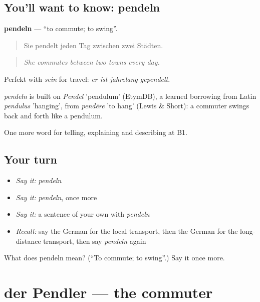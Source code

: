 \subsection*{You'll want to know: pendeln}
\textbf{pendeln} — \textquotedblleft{}to commute; to swing\textquotedblright{}.

\begin{quote}
Sie pendelt jeden Tag zwischen zwei Städten.
\end{quote}

\begin{quote}
\emph{She commutes between two towns every day.}
\end{quote}

Perfekt with \emph{sein} for travel: \emph{er ist jahrelang gependelt}.

\begin{cousinweb}
\emph{pendeln} is built on \emph{Pendel} 'pendulum' (EtymDB), a learned borrowing from Latin \emph{pendulus} 'hanging', from \emph{pendēre} 'to hang' (Lewis \& Short): a commuter swings back and forth like a pendulum.
\end{cousinweb}

\begin{grammarlens}[title={What you've built}]
One more word for telling, explaining and describing at B1.
\end{grammarlens}

\subsection*{Your turn}
\begin{itemize}
\raggedright
  \item \emph{Say it:} \emph{pendeln}
  \item \emph{Say it:} \emph{pendeln}, once more
  \item \emph{Say it:} a sentence of your own with \emph{pendeln}
  \item \emph{Recall:} say the German for the local transport, then the German for the long-distance transport, then say \emph{pendeln} again
\end{itemize}

\begin{tcolorbox}[breakable,colback=teal!4,colframe=teal!35!black,title={Before you move on}]
What does pendeln mean? (\textquotedblleft{}To commute; to swing\textquotedblright{}.) Say it once more.
\end{tcolorbox}
\section[der Pendler]{der Pendler — the commuter}

